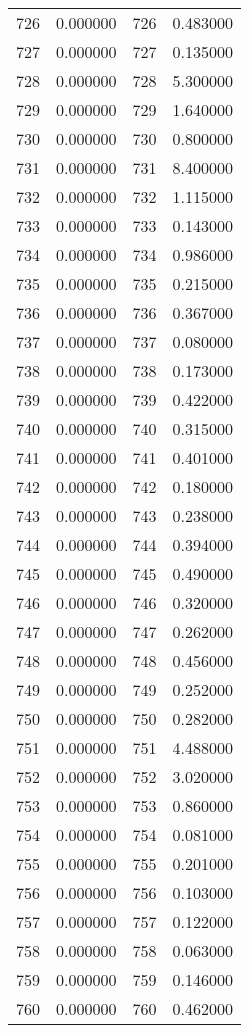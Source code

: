 \documentclass[12pt]{article}
\begin{document}
\begin{longtable}{@{}cccc@{}}
726 & 0.000000 & 726 & 0.483000 \\
727 & 0.000000 & 727 & 0.135000 \\
728 & 0.000000 & 728 & 5.300000 \\
729 & 0.000000 & 729 & 1.640000 \\
730 & 0.000000 & 730 & 0.800000 \\
731 & 0.000000 & 731 & 8.400000 \\
732 & 0.000000 & 732 & 1.115000 \\
733 & 0.000000 & 733 & 0.143000 \\
734 & 0.000000 & 734 & 0.986000 \\
735 & 0.000000 & 735 & 0.215000 \\
736 & 0.000000 & 736 & 0.367000 \\
737 & 0.000000 & 737 & 0.080000 \\
738 & 0.000000 & 738 & 0.173000 \\
739 & 0.000000 & 739 & 0.422000 \\
740 & 0.000000 & 740 & 0.315000 \\
741 & 0.000000 & 741 & 0.401000 \\
742 & 0.000000 & 742 & 0.180000 \\
743 & 0.000000 & 743 & 0.238000 \\
744 & 0.000000 & 744 & 0.394000 \\
745 & 0.000000 & 745 & 0.490000 \\
746 & 0.000000 & 746 & 0.320000 \\
747 & 0.000000 & 747 & 0.262000 \\
748 & 0.000000 & 748 & 0.456000 \\
749 & 0.000000 & 749 & 0.252000 \\
750 & 0.000000 & 750 & 0.282000 \\
751 & 0.000000 & 751 & 4.488000 \\
752 & 0.000000 & 752 & 3.020000 \\
753 & 0.000000 & 753 & 0.860000 \\
754 & 0.000000 & 754 & 0.081000 \\
755 & 0.000000 & 755 & 0.201000 \\
756 & 0.000000 & 756 & 0.103000 \\
757 & 0.000000 & 757 & 0.122000 \\
758 & 0.000000 & 758 & 0.063000 \\
759 & 0.000000 & 759 & 0.146000 \\
760 & 0.000000 & 760 & 0.462000 \\

\end{longtable}
\end{document}
